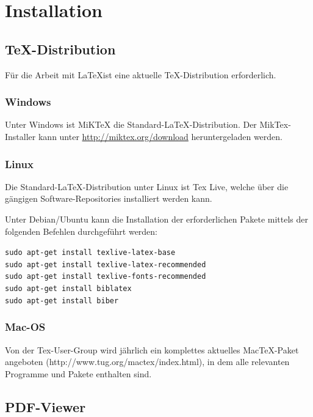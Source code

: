 \section{Installation}
\label{instal}

\subsection{TeX-Distribution}

Für die Arbeit mit \LaTeX ist eine aktuelle TeX-Distribution erforderlich. 

\subsubsection{Windows}

Unter Windows ist MiKTeX die Standard-{\LaTeX}-Distribution. Der MikTex-Installer kann unter \url{http://miktex.org/download} heruntergeladen werden.

\subsubsection{Linux}

Die Standard-{\LaTeX}-Distribution unter Linux ist Tex Live, welche über die gängigen Software-Repositories installiert werden kann.

Unter Debian/Ubuntu kann die Installation der erforderlichen Pakete mittels der folgenden Befehlen durchgeführt werden:

\texttt{sudo apt-get install texlive-latex-base}\\
\texttt{sudo apt-get install texlive-latex-recommended}\\
\texttt{sudo apt-get install texlive-fonts-recommended}\\
\texttt{sudo apt-get install biblatex}\\
\texttt{sudo apt-get install biber}

\subsubsection{Mac-OS}
Von der Tex-User-Group wird jährlich ein komplettes aktuelles Mac{\TeX}-Paket angeboten (http://www.tug.org/mactex/index.html), in dem alle relevanten Programme und Pakete enthalten sind.

\subsection{PDF-Viewer}

